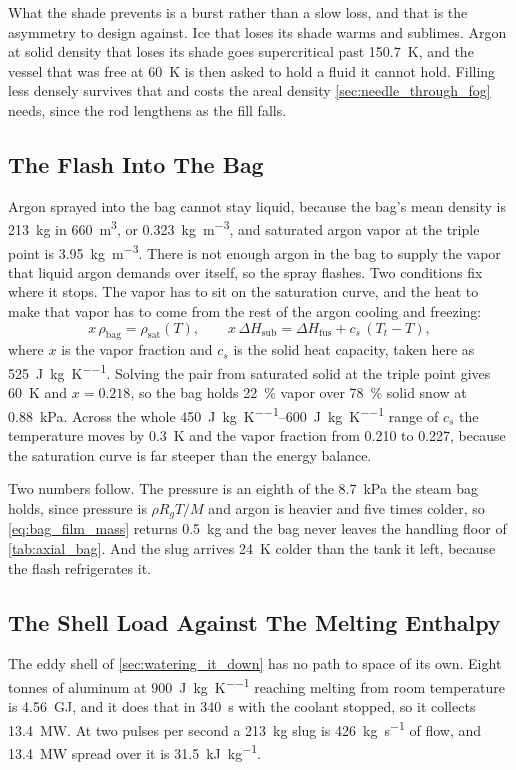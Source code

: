 \documentclass{article}
\begin{document}
What the shade prevents is a burst rather than a slow loss, and that is the asymmetry to design against. Ice that loses its shade warms and sublimes. Argon at solid density that loses its shade goes supercritical past \SI{150.7}{\kelvin}, and the vessel that was free at \SI{60}{\kelvin} is then asked to hold a fluid it cannot hold. Filling less densely survives that and costs the areal density \autoref{sec:needle_through_fog} needs, since the rod lengthens as the fill falls.

\subsection*{The Flash Into The Bag}
Argon sprayed into the bag cannot stay liquid, because the bag's mean density is \SI{213}{\kilogram} in \SI{660}{\cubic\meter}, or \SI{0.323}{\kilogram\per\cubic\meter}, and saturated argon vapor at the triple point is \SI{3.95}{\kilogram\per\cubic\meter}. There is not enough argon in the bag to supply the vapor that liquid argon demands over itself, so the spray flashes. Two conditions fix where it stops. The vapor has to sit on the saturation curve, and the heat to make that vapor has to come from the rest of the argon cooling and freezing:
\begin{equation}\label{eq:argon_flash}
x\,\rho_{\mathrm{bag}} = \rho_{\mathrm{sat}}(T), \qquad x\,\Delta H_{\mathrm{sub}} = \Delta H_{\mathrm{fus}} + c_s\,(T_t - T),
\end{equation}
where $x$ is the vapor fraction and $c_s$ is the solid heat capacity, taken here as \SI{525}{\joule\per\kilogram\per\kelvin}. Solving the pair from saturated solid at the triple point gives \SI{60}{\kelvin} and $x = 0.218$, so the bag holds \SI{22}{\percent} vapor over \SI{78}{\percent} solid snow at \SI{0.88}{\kilo\pascal}. Across the whole \SIrange{450}{600}{\joule\per\kilogram\per\kelvin} range of $c_s$ the temperature moves by \SI{0.3}{\kelvin} and the vapor fraction from \num{0.210} to \num{0.227}, because the saturation curve is far steeper than the energy balance.

Two numbers follow. The pressure is an eighth of the \SI{8.7}{\kilo\pascal} the steam bag holds, since pressure is $\rho R_g T/M$ and argon is heavier and five times colder, so \autoref{eq:bag_film_mass} returns \SI{0.5}{\kilogram} and the bag never leaves the handling floor of \autoref{tab:axial_bag}. And the slug arrives \SI{24}{\kelvin} colder than the tank it left, because the flash refrigerates it.

\subsection*{The Shell Load Against The Melting Enthalpy}
The eddy shell of \autoref{sec:watering_it_down} has no path to space of its own. Eight tonnes of aluminum at \SI{900}{\joule\per\kilogram\per\kelvin} reaching melting from room temperature is \SI{4.56}{\giga\joule}, and it does that in \SI{340}{\second} with the coolant stopped, so it collects \SI{13.4}{\mega\watt}. At two pulses per second a \SI{213}{\kilogram} slug is \SI{426}{\kilogram\per\second} of flow, and \SI{13.4}{\mega\watt} spread over it is \SI{31.5}{\kilo\joule\per\kilogram}.
\end{document}
